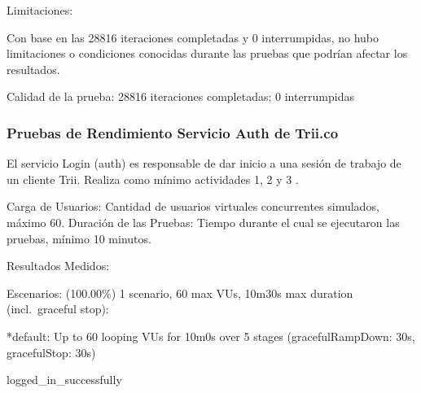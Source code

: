 \documentclass[
  paper=a4,
  ,captions=tableheading
]{scrartcl}
\renewenvironment{quote}{\begin{customblockquote}\list{}{\rightmargin=0em\leftmargin=0em}%
\item\relax\color{blockquote-text}\ignorespaces}{\unskip\unskip\endlist\end{customblockquote}}
\begin{document}
Limitaciones:

Con base en las 28816 iteraciones completadas y 0 interrumpidas, no hubo
limitaciones o condiciones conocidas durante las pruebas que podrían
afectar los resultados.

\begin{quote}
Calidad de la prueba: 28816 iteraciones completadas; 0 interrumpidas
\end{quote}

\subsubsection{Pruebas de Rendimiento Servicio Auth de
Trii.co}\label{sec:pruebas-de-rendimiento-servicio-auth-de-trii.co}

El servicio Login (auth) es responsable de dar inicio a una sesión de
trabajo de un cliente Trii. Realiza como mínimo actividades 1, 2 y 3 .

Carga de Usuarios: Cantidad de usuarios virtuales concurrentes
simulados, máximo 60. Duración de las Pruebas: Tiempo durante el cual se
ejecutaron las pruebas, mínimo 10 minutos.

Resultados Medidos:

\begin{quote}
Escenarios: (100.00\%) 1 scenario, 60 max VUs, 10m30s max duration
(incl.~graceful stop):

*default: Up to 60 looping VUs for 10m0s over 5 stages
(gracefulRampDown: 30s, gracefulStop: 30s)

logged\_in\_successfully
\end{quote}
\end{document}

